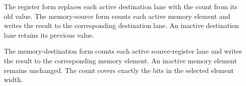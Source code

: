The register form replaces each active destination lane with the count from its
old value. The memory-source form counts each active memory element and writes
the result to the corresponding destination lane. An inactive destination lane
retains its previous value.

The memory-destination form counts each active source-register lane and writes
the result to the corresponding memory element. An inactive memory element
remains unchanged. The count covers exactly the bits in the selected element
width.
